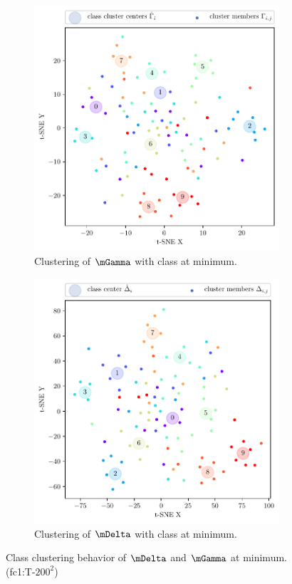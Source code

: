 \begin{figure}[H]
\begin{subfigure}[b]{0.4\textwidth}
        \includegraphics[width=\textwidth]{Appendix_Figures/TSNE_M/new/E-1_gamma_ccp_cluster_pred_fc1.pdf}
        \caption{Clustering of $\mGamma$ with class at minimum.}
        \label{fig:app_tsne_h_min}
    \end{subfigure}%
    \begin{subfigure}[b]{0.4\textwidth}
        \centering
        \captionsetup{justification=centering}
        \includegraphics[width=\textwidth]{Appendix_Figures/TSNE_M/new/E-1_delta_ccp_cluster_pred_fc1.pdf}
        \caption{Clustering of $\mDelta$ with class at minimum.}
        \label{fig:app_tsne_m_init}
    \end{subfigure}%
    \captionsetup{justification=centering}
    \caption{Class clustering behavior of $\mDelta$ and $\mGamma$ at minimum. (fc1:T-$200^2$)}
    \label{fig:tsne2}
\end{figure}
